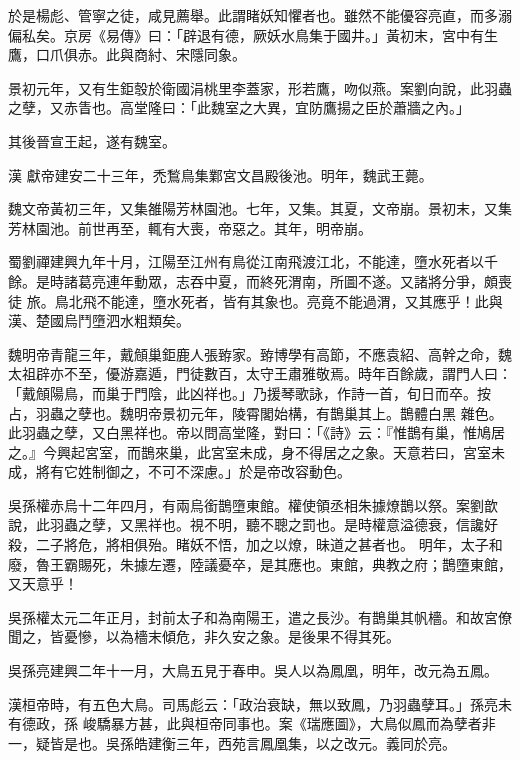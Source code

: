 \begin{pinyinscope}
 於是楊彪、管寧之徒，咸見薦舉。此謂睹妖知懼者也。雖然不能優容亮直，而多溺偏私矣。京房《易傳》曰：「辟退有德，厥妖水鳥集于國井。」黃初末，宮中有生鷹，口爪俱赤。此與商紂、宋隱同象。



 景初元年，又有生鉅彀於衛國涓桃里李蓋家，形若鷹，吻似燕。案劉向說，此羽蟲之孽，又赤眚也。高堂隆曰：「此魏室之大異，宜防鷹揚之臣於蕭牆之內。」



 其後晉宣王起，遂有魏室。



 漢
 獻帝建安二十三年，禿鶖鳥集鄴宮文昌殿後池。明年，魏武王薨。



 魏文帝黃初三年，又集雒陽芳林園池。七年，又集。其夏，文帝崩。景初末，又集芳林園池。前世再至，輒有大喪，帝惡之。其年，明帝崩。



 蜀劉禪建興九年十月，江陽至江州有鳥從江南飛渡江北，不能達，墮水死者以千餘。是時諸葛亮連年動眾，志吞中夏，而終死渭南，所圖不遂。又諸將分爭，頗喪徒
 旅。鳥北飛不能達，墮水死者，皆有其象也。亮竟不能過渭，又其應乎！此與漢、楚國烏鬥墮泗水粗類矣。



 魏明帝青龍三年，戴頠巢鉅鹿人張臶家。臶博學有高節，不應袁紹、高幹之命，魏太祖辟亦不至，優游嘉遁，門徒數百，太守王肅雅敬焉。時年百餘歲，謂門人曰：「戴頠陽鳥，而巢于門陰，此凶祥也。」乃援琴歌詠，作詩一首，旬日而卒。按占，羽蟲之孽也。魏明帝景初元年，陵霄閣始構，有鵲巢其上。鵲體白黑
 雜色。此羽蟲之孽，又白黑祥也。帝以問高堂隆，對曰：「《詩》云：『惟鵲有巢，惟鳩居之。』今興起宮室，而鵲來巢，此宮室未成，身不得居之之象。天意若曰，宮室未成，將有它姓制御之，不可不深慮。」於是帝改容動色。



 吳孫權赤烏十二年四月，有兩烏銜鵲墮東館。權使領丞相朱據燎鵲以祭。案劉歆說，此羽蟲之孽，又黑祥也。視不明，聽不聰之罰也。是時權意溢德衰，信讒好殺，二子將危，將相俱殆。睹妖不悟，加之以燎，昧道之甚者也。
 明年，太子和廢，魯王霸賜死，朱據左遷，陸議憂卒，是其應也。東館，典教之府；鵲墮東館，又天意乎！



 吳孫權太元二年正月，封前太子和為南陽王，遣之長沙。有鵲巢其帆檣。和故宮僚聞之，皆憂慘，以為檣末傾危，非久安之象。是後果不得其死。



 吳孫亮建興二年十一月，大鳥五見于春申。吳人以為鳳凰，明年，改元為五鳳。



 漢桓帝時，有五色大鳥。司馬彪云：「政治衰缺，無以致鳳，乃羽蟲孽耳。」孫亮未有德政，孫
 峻驕暴方甚，此與桓帝同事也。案《瑞應圖》，大鳥似鳳而為孽者非一，疑皆是也。吳孫皓建衡三年，西苑言鳳凰集，以之改元。義同於亮。




\end{pinyinscope}
